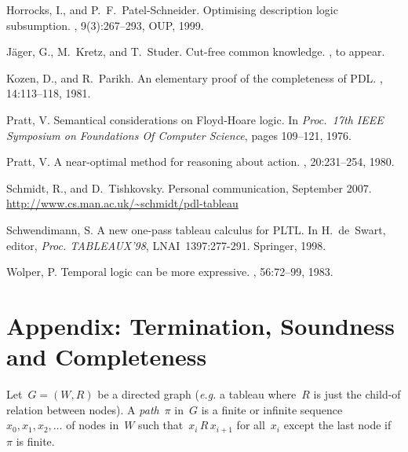 \documentclass{entcs}
\newcommand{\eg}{\emph{e.g.}}
\newcommand{\prel}[3]{#1 \,#2\, #3}
\begin{document}
\begin{thebibliography}{10}
  Horrocks, I., and P.~F.~Patel-Schneider.
  \newblock Optimising description logic subsumption.
  , 9(3):267--293, OUP, 1999.

  J{\"a}ger, G., M.~Kretz, and T.~Studer.
  \newblock Cut-free common knowledge.
  , to appear.

  Kozen, D., and R.~Parikh.
  \newblock An elementary proof of the completeness of {PDL}.
  , 14:113--118, 1981.

  Pratt, V.
  \newblock Semantical considerations on {Floyd-Hoare} logic.
  \newblock In {\em Proc.\ 17th IEEE Symposium on Foundations Of Computer Science}, pages 109--121, 1976.

  Pratt, V.
  \newblock A near-optimal method for reasoning about action.
  , 20:231--254, 1980.

  Schmidt, R., and D.~Tishkovsky. Personal communication, September 2007.
  \newblock \url{http://www.cs.man.ac.uk/~schmidt/pdl-tableau}

  Schwendimann, S.
  \newblock A new one-pass tableau calculus for {PLTL}.
  \newblock In H.~de~Swart, editor, {\em Proc. TABLEAUX'98}, LNAI~1397:277-291. Springer, 1998.

  Wolper, P.
  \newblock Temporal logic can be more expressive.
  , 56:72--99, 1983.

\end{thebibliography}


\newpage


\section*{Appendix: Termination, Soundness and Completeness}

\begin{definition}
  Let~$G = (W, R)$ be a directed graph
  (\eg{} a tableau
  where~$R$ is just the child-of relation between nodes).
  A \emph{path}~$\pi$ in~$G$
  is a finite or infinite sequence~$x_0, x_1, x_2, \dotsc$ of nodes in~$W$
  such that~$\prel{x_i}{R}{x_{i+1}}$ for all~$x_i$
  except the last node if~$\pi$ is finite.
\end{definition}
\end{document}
